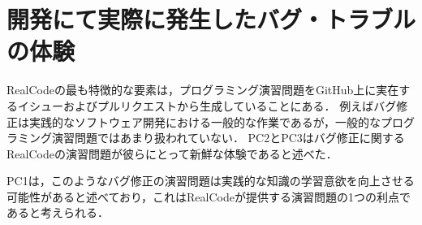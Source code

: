 
\section{開発にて実際に発生したバグ・トラブルの体験}
RealCodeの最も特徴的な要素は，プログラミング演習問題をGitHub上に実在するイシューおよびプルリクエストから生成していることにある．
例えばバグ修正は実践的なソフトウェア開発における一般的な作業であるが，一般的なプログラミング演習問題ではあまり扱われていない．
PC2とPC3はバグ修正に関するRealCodeの演習問題が彼らにとって新鮮な体験であると述べた．





PC1は，このようなバグ修正の演習問題は実践的な知識の学習意欲を向上させる可能性があると述べており，これはRealCodeが提供する演習問題の1つの利点であると考えられる．



